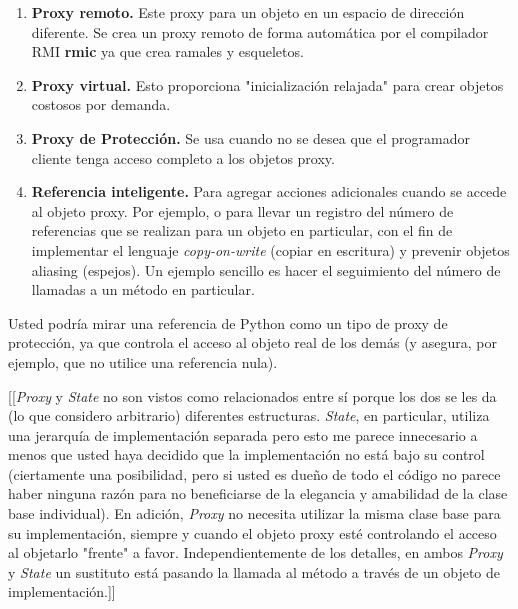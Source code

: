 \begin{enumerate}[1.]

    \item \textbf{Proxy remoto.} Este proxy para un objeto en un espacio de dirección diferente. Se crea un proxy remoto de forma automática por el compilador RMI \textbf{rmic} ya que crea ramales y esqueletos.
    
    \item \textbf{Proxy virtual.} Esto proporciona "inicialización relajada" para crear objetos costosos por demanda.
    
    \item \textbf{Proxy de Protección.} Se usa cuando no se desea que el programador cliente tenga acceso completo a los objetos proxy.
    
    \item \textbf{Referencia inteligente.} Para agregar acciones adicionales cuando se accede al objeto proxy. Por ejemplo, o para llevar un registro del número de referencias que se realizan para un objeto en particular, con el fin de implementar el lenguaje \textit{copy-on-write} (copiar en escritura) y prevenir objetos aliasing (espejos). Un ejemplo sencillo es hacer el seguimiento del número de llamadas a un método en particular.
    
\end{enumerate}

Usted podría mirar una referencia de Python como un tipo de proxy de protección, ya que controla el acceso al objeto real de los demás (y asegura, por ejemplo, que no utilice una referencia nula). \newline

[[\textit{Proxy} y \textit{State} no son vistos como relacionados entre sí porque los dos se les da (lo que considero arbitrario) diferentes estructuras.
\textit{State}, en particular, utiliza una jerarquía de implementación separada pero esto me parece innecesario a menos que usted haya decidido que la implementación no está bajo su control (ciertamente una posibilidad, pero si usted es dueño de todo el código no parece haber ninguna razón para no beneficiarse de la elegancia y amabilidad de la clase base individual). En adición, \textit{Proxy} no necesita utilizar la misma clase base para su implementación, siempre y cuando el objeto proxy esté controlando el acceso al objetarlo "frente" a favor. %
Independientemente de los detalles, en ambos \textit{Proxy} y \textit{State} un sustituto está pasando la llamada al método a través de un objeto de implementación.]]

